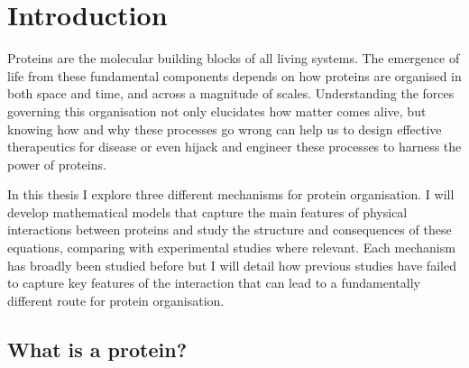

\chapter{\label{ch:1-intro}Introduction} 

\minitoc



Proteins are the molecular building blocks of all living systems. The emergence of life from these fundamental components depends on how proteins are organised in both space and time, and across a magnitude of scales. Understanding the forces governing this organisation not only elucidates how matter comes alive, but knowing how and why these processes go wrong can help us to design effective therapeutics for disease or even hijack and engineer these processes to harness the power of proteins.

In this thesis I explore three different mechanisms for protein organisation. I will develop mathematical models that capture the main features of physical interactions between proteins and study the structure and consequences of these equations, comparing with experimental studies where relevant. Each mechanism has broadly been studied before but I will detail how previous studies have failed to capture key features of the interaction that can lead to a fundamentally different route for protein organisation.

\section{What is a protein?}

